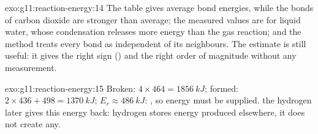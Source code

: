 \begin{solution}{exo:g11:reaction-energy:14}
The table gives average bond energies, while the  bonds of
carbon dioxide are stronger than average; the measured values are for
liquid water, whose condensation releases more energy than the gas
reaction; and the method treats every bond as independent of its
neighbours. The estimate is still useful: it gives the right sign
() and the right order of magnitude without any measurement.
\end{solution}

\begin{solution}{exo:g11:reaction-energy:15}
Broken: $4 \times 464 = \qty{1856}{kJ}$; formed: $2 \times 436 + 498 =
\qty{1370}{kJ}$; $E_r \approx \qty{+486}{kJ}$: , so energy
must be supplied.  the hydrogen later gives this energy back:
hydrogen stores energy produced elsewhere, it does not create any.
\end{solution}

